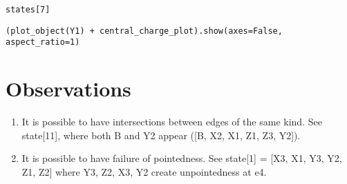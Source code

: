 \documentclass[11pt]{article}
\begin{document}
\begin{verbatim}
states[7]
\end{verbatim}

\begin{verbatim}
(plot_object(Y1) + central_charge_plot).show(axes=False, aspect_ratio=1)
\end{verbatim}

\section{Observations}
\label{sec:org35bd8ea}
\begin{enumerate}
\item It is possible to have intersections between edges of the same kind. 
See state[11], where both B and Y2 appear ([B, X2, X1, Z1, Z3, Y2]).
\item It is possible to have failure of pointedness.
See state[1] = [X3, X1, Y3, Y2, Z1, Z2] where Y3, Z2, X3, Y2 create unpointedness at e4.
\end{enumerate}
\end{document}
